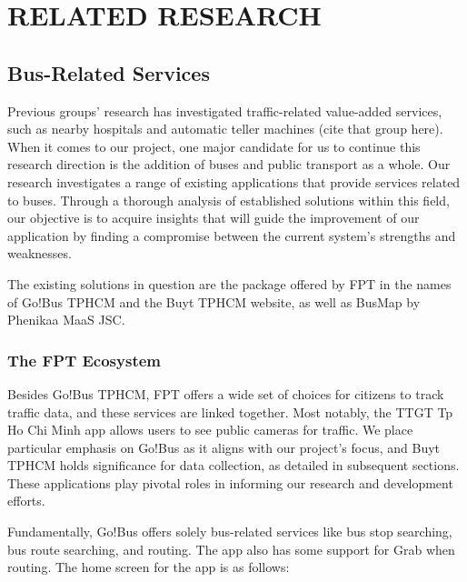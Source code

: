 %
%
\section{RELATED RESEARCH}

\subsection{Bus-Related Services}

Previous groups' research has investigated traffic-related value-added services, such as nearby hospitals and automatic teller machines (cite that group here). When it comes to our project, one major candidate for us to continue this research direction is the addition of buses and public transport as a whole. Our research investigates a range of existing applications that provide services related to buses. Through a thorough analysis of established solutions within this field, our objective is to acquire insights that will guide the improvement of our application by finding a compromise between the current system's strengths and weaknesses.

The existing solutions in question are the package offered by FPT in the names of Go!Bus TPHCM and the Buyt TPHCM website, as well as BusMap by Phenikaa MaaS JSC.
\subsubsection{The FPT Ecosystem}

Besides Go!Bus TPHCM, FPT offers a wide set of choices for citizens to track traﬀic data, and these services are linked together. Most notably, the TTGT Tp Ho Chi Minh app allows users to see public cameras for traﬀic. We place particular emphasis on Go!Bus as it aligns with our project's focus, and Buyt TPHCM holds significance for data collection, as detailed in subsequent sections. These applications play pivotal roles in informing our research and development efforts.


Fundamentally, Go!Bus offers solely bus-related services like bus stop searching, bus route searching, and routing. The app also has some support for Grab when routing. The home screen for the app is as follows:

